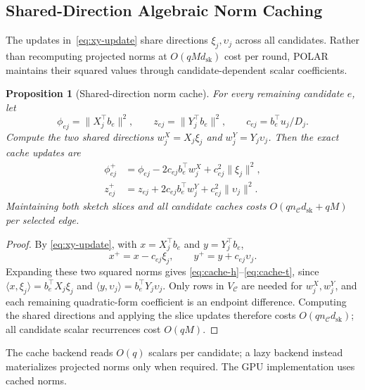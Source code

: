 \documentclass[conference]{IEEEtran}
\newtheorem{proposition}{Proposition}
\theoremstyle{definition}
\newcommand{\POLAR}{\textsc{POLAR}}
\newcommand{\dsk}{d_{\mathrm{sk}}}
\begin{document}
\subsection{Shared-Direction Algebraic Norm Caching}
\label{sec:norm-cache}

The updates in~\eqref{eq:xy-update} share directions $\xi_j,\upsilon_j$
across all candidates. Rather than recomputing projected norms at
$O(q M \dsk)$ cost per round, \POLAR{} maintains their squared values
through candidate-dependent scalar coefficients.

\begin{proposition}[Shared-direction norm cache]
\label{prop:norm-cache}
For every remaining candidate $e$, let
\[
\phi_{ej}=\|X_j^\top b_e\|^2,\qquad
z_{ej}=\|Y_j^\top b_e\|^2,\qquad
c_{ej}=b_e^\top u_j/D_j.
\]
Compute the two shared directions
$w_j^X=X_j\xi_j$ and $w_j^Y=Y_j\upsilon_j$.
Then the exact cache updates are
\begin{align}
\phi_{ej}^+&=\phi_{ej}-2c_{ej}b_e^\top w_j^X
                    +c_{ej}^2\|\xi_j\|^2,\label{eq:cache-h}\\
z_{ej}^+&=z_{ej}+2c_{ej}b_e^\top w_j^Y
                    +c_{ej}^2\|\upsilon_j\|^2.\label{eq:cache-t}
\end{align}
Maintaining both sketch slices and all candidate caches costs
$O(q n_{\mathcal C}\dsk+q M)$ per selected edge.
\end{proposition}
\begin{proof}
By \eqref{eq:xy-update}, with $x=X_j^\top b_e$ and $y=Y_j^\top b_e$,
\[
x^+=x-c_{ej}\xi_j,\qquad y^+=y+c_{ej}{\upsilon}_j.
\]
Expanding these two squared norms gives
\eqref{eq:cache-h}--\eqref{eq:cache-t}, since
$\langle x,\xi_j\rangle=b_e^\top X_j\xi_j$ and
$\langle y,{\upsilon}_j\rangle=b_e^\top Y_j{\upsilon}_j$.
Only rows in $V_{\mathcal C}$ are needed for $w_j^X,w_j^Y$,
and each remaining quadratic-form coefficient is an endpoint
difference. Computing the shared directions and applying the
slice updates therefore costs $O(qn_{\mathcal C}{\dsk})$;
all candidate scalar recurrences cost $O(qM)$.
\end{proof}

The cache backend reads $O(q)$ scalars per candidate; a lazy backend
instead materializes projected norms only when required. The GPU
implementation uses cached norms.
\end{document}
